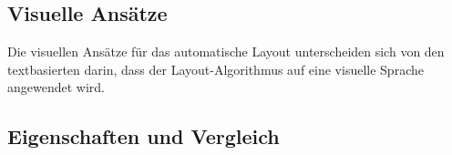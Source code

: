 \subsection{Visuelle Ansätze}
\label{subsec:visual-approaches}

Die visuellen Ansätze für das automatische Layout unterscheiden sich von den textbasierten darin, dass der Layout-Algorithmus auf eine visuelle Sprache angewendet wird.





\subsection{Eigenschaften und Vergleich}
